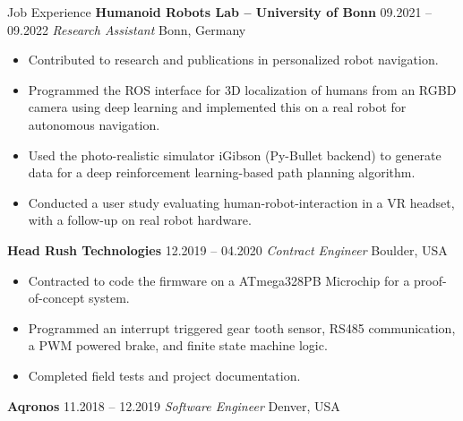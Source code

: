 \begin{rubric}{Job Experience}
%
%
\entry*[] \textbf{Humanoid Robots Lab -- University of Bonn} \hfill 09.2021 -- 09.2022 \newline
 \textit{Research Assistant} \hfill Bonn, Germany \newline 
\vspace{\CVItemizeHeaderSpacing} \begin{itemize}[leftmargin=*, rightmargin=1cm]
	\setlength{\itemsep}{\CVItemizeSpacing}
	\item Contributed to research and publications in personalized robot navigation.
	\item Programmed the ROS interface for 3D localization of humans from an RGBD camera using deep learning and implemented this on a real robot for autonomous navigation.
	\item Used the photo-realistic simulator iGibson (Py-Bullet backend) to generate data for a deep reinforcement learning-based path planning algorithm. 
	\item Conducted a user study evaluating human-robot-interaction in a VR headset, with a follow-up on real robot hardware.
\end{itemize}
%
%
\entry*[] \textbf{Head Rush Technologies} \hfill 12.2019 -- 04.2020 \newline
 \textit{Contract Engineer} \hfill Boulder, USA \newline 
\vspace{\CVItemizeHeaderSpacing} \begin{itemize}[leftmargin=*, rightmargin=1cm]
	\setlength{\itemsep}{\CVItemizeSpacing}
	\item Contracted to code the firmware on a ATmega328PB Microchip for a proof-of-concept system.  
	\item Programmed an interrupt triggered gear tooth sensor, RS485 communication, a PWM powered brake, and finite state machine logic.  
	\item Completed field tests and project documentation.  
\end{itemize}
%
\entry*[] \textbf{Aqronos} \hfill 11.2018 -- 12.2019 \newline
\textit{Software Engineer} \hfill Denver, USA \newline
\vspace{\CVItemizeHeaderSpacing} \begin{itemize}[leftmargin=*, rightmargin=1cm]
	\setlength{\itemsep}{\CVItemizeSpacing}

\end{itemize}
\end{rubric}
